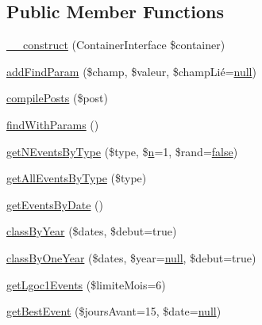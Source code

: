 \subsection*{Public Member Functions}
\begin{DoxyCompactItemize}
\item 
\hyperlink{class_acme_group_1_1services_1_1entities_services_1_1evenement_ae0c44876fdbf7a229cf3382a2b486acc}{\+\_\+\+\_\+construct} (Container\+Interface \$container)
\item 
\hyperlink{class_acme_group_1_1services_1_1entities_services_1_1evenement_a034879ed8aa825acadc614f33f6bcf83}{add\+Find\+Param} (\$champ, \$valeur, \$champ\+Lié=\hyperlink{validate_8js_afb8e110345c45e74478894341ab6b28e}{null})
\item 
\hyperlink{class_acme_group_1_1services_1_1entities_services_1_1evenement_abba33be006ed5cf21ecc8e1785c6f671}{compile\+Posts} (\$post)
\item 
\hyperlink{class_acme_group_1_1services_1_1entities_services_1_1evenement_a74a0da39407b79bc7f2d28b839011aa4}{find\+With\+Params} ()
\item 
\hyperlink{class_acme_group_1_1services_1_1entities_services_1_1evenement_a36ec635dae661eef8425de9b7b8ab782}{get\+N\+Events\+By\+Type} (\$type, \$\hyperlink{fullpage_2plugin_8min_8js_ab767a859d1217315f42c9bb52fc648dc}{n}=1, \$rand=\hyperlink{validate_8js_a5df37b7f02e5cdc7d9412b7f872b8e01}{false})
\item 
\hyperlink{class_acme_group_1_1services_1_1entities_services_1_1evenement_a6a5490ec418f396d39c87cc866ebc5b7}{get\+All\+Events\+By\+Type} (\$type)
\item 
\hyperlink{class_acme_group_1_1services_1_1entities_services_1_1evenement_a6d43931d7052de1f2731b4aaabf4c961}{get\+Events\+By\+Date} ()
\item 
\hyperlink{class_acme_group_1_1services_1_1entities_services_1_1evenement_a9405b3be6102dd3e6abd27992b5842f4}{class\+By\+Year} (\$dates, \$debut=true)
\item 
\hyperlink{class_acme_group_1_1services_1_1entities_services_1_1evenement_ac9e540e8732b247c1bada20665a18cb6}{class\+By\+One\+Year} (\$dates, \$year=\hyperlink{validate_8js_afb8e110345c45e74478894341ab6b28e}{null}, \$debut=true)
\item 
\hyperlink{class_acme_group_1_1services_1_1entities_services_1_1evenement_afe6a9f6c8503c17c43d1dd76bf21d7c6}{get\+Lgoc1\+Events} (\$limite\+Mois=6)
\item 
\hyperlink{class_acme_group_1_1services_1_1entities_services_1_1evenement_a3fec41628c33c19b1679b31f7cff85e0}{get\+Best\+Event} (\$jours\+Avant=15, \$date=\hyperlink{validate_8js_afb8e110345c45e74478894341ab6b28e}{null})
\end{DoxyCompactItemize}
